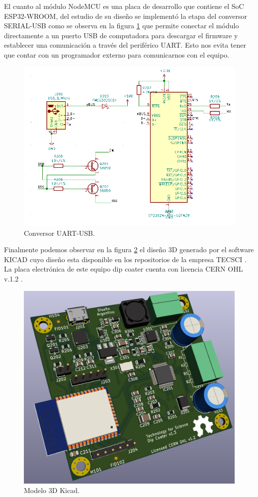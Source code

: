 El cuanto al módulo NodeMCU es una placa de desarrollo que contiene el SoC ESP32-WROOM, del estudio de su diseño se implementó la etapa del conversor SERIAL-USB como se observa en la figura \ref{fig:kicad_conversor} que permite conectar el módulo directamente a un puerto USB de computadora para descargar el firmware y establecer una comunicación a través del periférico UART. Esto nos evita tener que contar con un programador externo para comunicarnos con el equipo.
\begin{figure}[h]
	\centering
	\includegraphics[width=1\textwidth]{./Figures/kicad_conversor.png}
	\caption{Conversor UART-USB.}
	\label{fig:kicad_conversor}
\end{figure}

  
Finalmente podemos observar en la figura \ref{fig:dip_3d_model} el diseño 3D generado por el software KICAD cuyo diseño esta disponible en los repositorios de la empresa TECSCI \citep{web_hardware_tecsci}. La placa electrónica de este equipo dip coater cuenta con licencia CERN OHL v.1.2 \citep{web_cern_licence}.


\begin{figure}[h]
	\centering
	\includegraphics[width=.5\textwidth]{./Figures/dip_3d_model.pdf}
	\caption{Modelo 3D Kicad.}
	\label{fig:dip_3d_model}
\end{figure}
         




